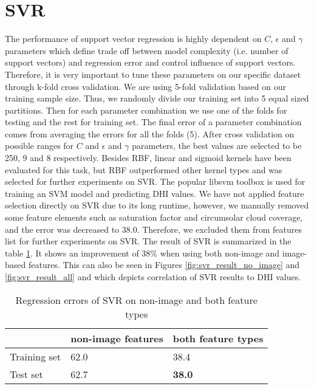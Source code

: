 \section{SVR}
The performance of support vector regression is highly dependent on $C$, $\epsilon$ and $\gamma$ parameters which define trade off between model complexity (i.e. number of support vectors) and regression error and control influence of support vectors. Therefore, it is very important to tune these parameters on our specific dataset through k-fold cross validation. We are using 5-fold validation based on our training sample size. Thus, we randomly divide our training set into 5 equal sized partitions. Then for each parameter combination we use one of the folds for testing and the rest for training set. The final error of a parameter combination comes from averaging the errors for all the folds (5). After cross validation on possible ranges for $C$ and $\epsilon$  and $\gamma$ parameters, the best values are selected to be 250, 9 and 8 respectively. Besides RBF, linear and sigmoid kernels have been evaluated for this task, but RBF outperformed other kernel types and was selected for further experiments on SVR. The popular libsvm toolbox is used for training an SVM model and predicting DHI values. We have not applied feature selection directly on SVR due to its long runtime, however, we manually removed some feature elements such as saturation factor and circumsolar cloud coverage, and the error was decreased to 38.0. Therefore, we excluded them from features list for further experiments on SVR.
\newline
The result of SVR is summarized in the table \ref{table:rmse_svr}. It shows an improvement of 38\% when using both non-image and image-based features. This can also be seen in Figures \ref{fig:svr_result_no_image} and \ref{fig:svr_result_all} and which depicts correlation of SVR results to DHI values.

\begin{table}[h!]
\centering
\begin{tabular}{ |p{2.5cm}||p{4cm}|p{4cm}|  }
 \hline
 &non-image features& both feature types\\
 \hline
 Training set &   62.0  & 38.4 \\
 Test set&   62.7  & \textbf{38.0} \\
 \hline
\end{tabular}
\caption{Regression errors of SVR on non-image and both feature types}
\label{table:rmse_svr}
\end{table}

